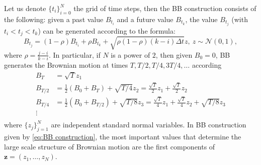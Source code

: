 \documentclass[11pt]{article}
\newcommand{\COMMA}{,}
\begin{document}
Let us denote $\{t_i\}_{i=0}^{N}$ the grid of time steps, then the BB construction \cite{glasserman2004monte} consists of the following: given a past value $B_{t_i}$ and a future value $B_{t_k}$, the value $B_{t_j}$ (with $t_i < t_j < t_k$) can be generated according to the formula:
\begin{equation}
B_{t_j}=(1-\rho) B_{t_i}+\rho B_{t_k}+ \sqrt{\rho (1-\rho)(k-i) \Delta t} z, \: z \sim \mathcal{N}(0,1) \COMMA
\end{equation}
where $\rho=\frac{j-i}{k-i}$.  In particular, if $N$ is a power of $2$, then given $B_0=0$, BB generates the Brownian motion at times $T, T/2,T/4,3T/4,\dots$ according
\begin{align}\label{eq:BB construction}
	B_T&=\sqrt{T}z_1\nonumber\\
	B_{T/2}&= \frac{1}{2}(B_{0}+B_{T})+\sqrt{T/4}z_2= \frac{\sqrt{T}}{2} z_1+\frac{\sqrt{T}}{2} z_2\nonumber\\
	B_{T/4}&=\frac{1}{2} (B_{0}+B_{T/2})+\sqrt{T/8}z_3= \frac{\sqrt{T}}{4} z_1+\frac{\sqrt{T}}{4} z_2+\sqrt{T/8}z_3\nonumber\\
	\vdots \nonumber\\
\end{align}
where $\{z_j\}_{j=1}^{N}$ are independent standard normal variables.  In BB construction given by \eqref{eq:BB construction}, the most important values that determine the large scale structure of Brownian motion are the first components of $\mathbf{z} = (z_1,\dots,z_N)$.



\end{document}
